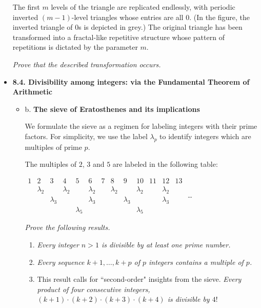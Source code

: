 \begin{itemize}
The first $m$ levels of the triangle are replicated endlessly, with periodic inverted $(m-1)$-level triangles whose entries are all $0$.  (In the figure, the inverted triangle of $0$s is depicted in grey.) 
The original triangle has been transformed into a fractal-like repetitive structure whose pattern of repetitions is dictated by the parameter $m$.

\medskip

{\em Prove that the described transformation occurs.}

%
\medskip\item
{\bf 8.4. Divisibility among integers: via the Fundamental Theorem of Arithmetic}

  \begin{itemize}
\item
b. {\bf The sieve of Eratosthenes and its implications}

We formulate the sieve as a regimen for labeling integers with their prime factors.  For simplicity, we use the label $\lambda_p$ to identify integers which are multiples of prime $p$.
\medskip

The multiples of $2$, $3$ and $5$ are labeled in the following table:

$\begin{array}{c|c|c|c|c|c|c|c|c|c|c|c|c}
1 & 2 & 3 & 4 & 5 & 6 & 7 & 8 & 9 & 10 & 11 & 12 & 13 \\
 & \lambda_2 & & \lambda_2 & & \lambda_2 & & \lambda_2 & & \lambda_2 & & \lambda_2 & \\
 & & \lambda_3 & &  & \lambda_3 & & & \lambda_3 & & & \lambda_3 & \\
 & & & & \lambda_5 & & & & & \lambda_5 & & & 
\end{array}$ \ldots

\bigskip

{\em Prove the following results.}
     \begin{enumerate}
     \item
{\em 
Every integer $n>1$ is divisible by at least one prime number.
}

     \medskip\item
{\em 
Every sequence $k+1, \ldots, k+p$ of $p$ integers contains a multiple of $p$.
}

      \medskip\item This result calls for ``second-order" insights from the sieve.
{\em 
Every product of four consecutive integers, $(k+1) \cdot (k+2) \cdot (k+3) \cdot (k+4)$ is divisible by $4!$
}
\smallskip


\end{enumerate}
\end{itemize}
\end{itemize}

